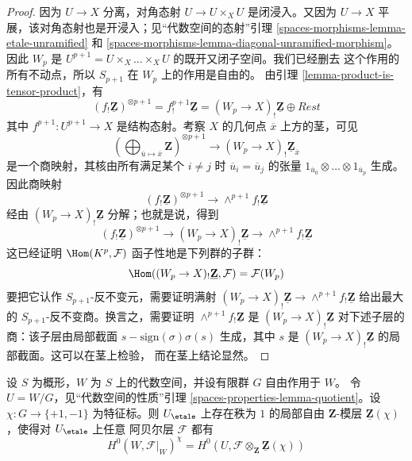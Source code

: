 \begin{proof}
因为 $U \to X$ 分离，对角态射 $U \to U \times_X U$ 是闭浸入。又因为
$U \to X$ 平展，该对角态射也是开浸入；见“代数空间的态射”引理
\ref{spaces-morphisms-lemma-etale-unramified} 和
\ref{spaces-morphisms-lemma-diagonal-unramified-morphism}。因此 $W_p$ 是
$U^{p + 1} = U \times_X \ldots \times_X U$ 的既开又闭子空间。我们已经删去
这个作用的所有不动点，所以 $S_{p + 1}$ 在 $W_p$ 上的作用是自由的。
由引理 \ref{lemma-product-is-tensor-product}，有
$$
(f_!\underline{\mathbf{Z}})^{\otimes p + 1} =
f^{p + 1}_!\underline{\mathbf{Z}} = (W_p \to X)_!\underline{\mathbf{Z}}
\oplus Rest
$$
其中 $f^{p + 1} : U^{p + 1} \to X$ 是结构态射。考察 $X$ 的几何点
$\overline{x}$ 上方的茎，可见
$$
\left(
\bigoplus\nolimits_{\overline{u} \mapsto \overline{x}} \mathbf{Z}
\right)^{\otimes p + 1}
\longrightarrow
(W_p \to X)_!\underline{\mathbf{Z}}_{\overline{x}}
$$
是一个商映射，其核由所有满足某个 $i \not = j$ 时
$\overline{u}_i = \overline{u}_j$ 的张量
$1_{\overline{u}_0} \otimes \ldots \otimes 1_{\overline{u}_p}$ 生成。
因此商映射
$$
(f_!\underline{\mathbf{Z}})^{\otimes p + 1}
\longrightarrow
\wedge^{p + 1}f_!\underline{\mathbf{Z}}
$$
经由 $(W_p \to X)_!\underline{\mathbf{Z}}$ 分解；也就是说，得到
$$
(f_!\underline{\mathbf{Z}})^{\otimes p + 1}
\longrightarrow
(W_p \to X)_!\underline{\mathbf{Z}}
\longrightarrow
\wedge^{p + 1}f_!\underline{\mathbf{Z}}
$$
这已经证明 $\Hom(K^p, \mathcal{F})$ 函子性地是下列群的子群：
$$
\Hom((W_p \to X)_!\underline{\mathbf{Z}}, \mathcal{F}) = \mathcal{F}(W_p)
$$
要把它认作 $S_{p + 1}$-反不变元，需要证明满射
$(W_p \to X)_!\underline{\mathbf{Z}}
\to \wedge^{p + 1}f_!\underline{\mathbf{Z}}$ 给出最大的
$S_{p + 1}$-反不变商。换言之，需要证明
$\wedge^{p + 1}f_!\underline{\mathbf{Z}}$ 是
$(W_p \to X)_!\underline{\mathbf{Z}}$ 对下述子层的商：该子层由局部截面
$s - \text{sign}(\sigma)\sigma(s)$ 生成，其中 $s$ 是
$(W_p \to X)_!\underline{\mathbf{Z}}$ 的局部截面。这可以在茎上检验，
而在茎上结论显然。
\end{proof}

\begin{lemma}
\label{lemma-twist}
设 $S$ 为概形，$W$ 为 $S$ 上的代数空间，并设有限群 $G$ 自由作用于 $W$。
令 $U = W/G$，见“代数空间的性质”引理
\ref{spaces-properties-lemma-quotient}。设
$\chi : G \to \{+1, -1\}$ 为特征标。则 $U_\etale$ 上存在秩为 $1$ 的局部自由
$\mathbf{Z}$-模层 $\underline{\mathbf{Z}}(\chi)$，使得对 $U_\etale$ 上任意
阿贝尔层 $\mathcal{F}$ 都有
$$
H^0(W, \mathcal{F}|_W)^\chi =
H^0(U, \mathcal{F} \otimes_{\mathbf{Z}} \underline{\mathbf{Z}}(\chi))
$$
\end{lemma}

